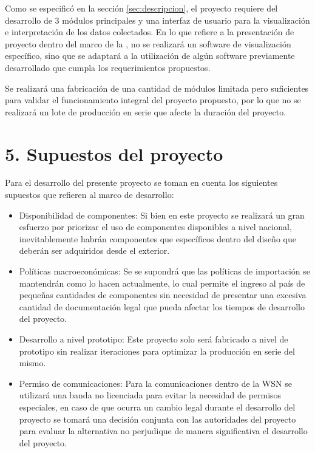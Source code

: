 \documentclass[
11pt, %
codirector, %
]{charter}
\begin{document}
Como se especificó en la sección \ref{sec:descripcion}, el proyecto requiere del desarrollo de 3 módulos principales y una interfaz de usuario para la visualización e interpretación de los datos colectados. En lo que refiere a la presentación de proyecto dentro del marco de la \posgrado, no se realizará un software de visualización específico, sino que se adaptará a la utilización de algún software previamente desarrollado que cumpla los requerimientos propuestos.

Se realizará una fabricación de una cantidad de módulos limitada pero suficientes para validar el funcionamiento integral del proyecto propuesto, por lo que no se realizará un lote de producción en serie que afecte la duración del proyecto.

\section{5. Supuestos del proyecto}
\label{sec:supuestos}

Para el desarrollo del presente proyecto se toman en cuenta los siguientes supuestos que refieren al marco de desarrollo:

\begin{itemize}
\item Disponibilidad de componentes: Si bien en este proyecto se realizará un gran esfuerzo por priorizar el uso de componentes disponibles a nivel nacional, inevitablemente habrán componentes que específicos dentro del diseño que deberán ser adquiridos desde el exterior.
\item Políticas macroeconómicas: Se se supondrá que las políticas de importación se mantendrán como lo hacen actualmente, lo cual permite el ingreso al país de pequeñas cantidades de componentes sin necesidad de presentar una excesiva cantidad de documentación legal que pueda afectar los tiempos de desarrollo del proyecto.
\item Desarrollo a nivel prototipo: Este proyecto solo será fabricado a nivel de prototipo sin realizar iteraciones para optimizar la producción en serie del mismo.
\item Permiso de comunicaciones: Para la comunicaciones dentro de la WSN se utilizará una banda no licenciada para evitar la necesidad de permisos especiales, en caso de que ocurra un cambio legal durante el desarrollo del proyecto se tomará una decisión conjunta con las autoridades del proyecto para evaluar la alternativa no perjudique de manera significativa el desarrollo del proyecto.
\end{itemize}
\end{document}
